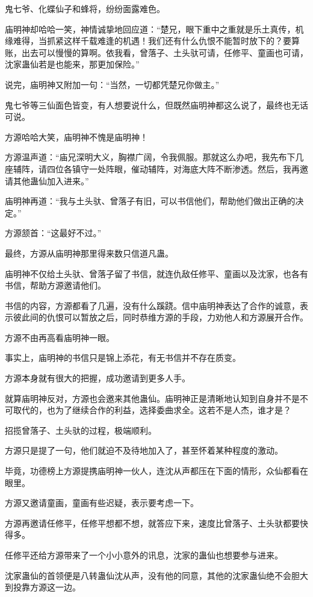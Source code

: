 \begin{this_body}
鬼七爷、化蝶仙子和蜂将，纷纷面露难色。

庙明神却哈哈一笑，神情诚挚地回应道：“楚兄，眼下重中之重就是乐土真传，机缘难得，当抓紧这样千载难逢的机遇！我们还有什么仇恨不能暂时放下的？要算账，出去可以慢慢的算啊。依我看，曾落子、土头驮可请，任修平、童画也可请，沈家蛊仙若是也能来，那更加保险。”

说完，庙明神又附加一句：“当然，一切都凭楚兄你做主。”

鬼七爷等三仙面色皆变，有人想要说什么，但既然庙明神都这么说了，最终也无话可说。

方源哈哈大笑，庙明神不愧是庙明神！

方源温声道：“庙兄深明大义，胸襟广阔，令我佩服。那就这么办吧，我先布下几座辅阵，请四位各镇守一处阵眼，催动辅阵，对海底大阵不断渗透。然后，我再邀请其他蛊仙加入进来。”

庙明神再道：“我与土头驮、曾落子有旧，可以书信他们，帮助他们做出正确的决定。”

方源颔首：“这最好不过。”

最终，方源从庙明神那里得来数只信道凡蛊。

庙明神不仅给土头驮、曾落子留了书信，就连仇敌任修平、童画以及沈家，也各有书信，帮助方源邀请他们。

书信的内容，方源都看了几遍，没有什么蹊跷。信中庙明神表达了合作的诚意，表示彼此间的仇恨可以暂放之后，同时恭维方源的手段，力劝他人和方源展开合作。

方源不由再高看庙明神一眼。

事实上，庙明神的书信只是锦上添花，有无书信并不存在质变。

方源本身就有很大的把握，成功邀请到更多人手。

就算庙明神反对，方源也会邀来其他蛊仙。庙明神正是清晰地认知到自身并不是不可取代的，也为了继续合作的利益，选择委曲求全。这若不是人杰，谁才是？

招揽曾落子、土头驮的过程，极端顺利。

方源只是提了一句，他们就迫不及待地加入了，甚至怀着某种程度的激动。

毕竟，功德榜上方源提携庙明神一伙人，连沈从声都压在下面的情形，众仙都看在眼里。

方源又邀请童画，童画有些迟疑，表示要考虑一下。

方源再邀请任修平，任修平想都不想，就答应下来，速度比曾落子、土头驮都要快得多。

任修平还给方源带来了一个小小意外的讯息，沈家的蛊仙也想要参与进来。

沈家蛊仙的首领便是八转蛊仙沈从声，没有他的同意，其他的沈家蛊仙绝不会胆大到投靠方源这一边。


\end{this_body}
